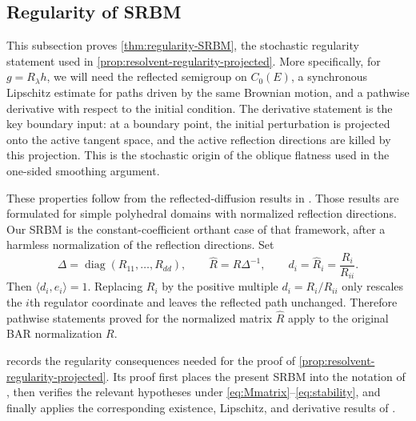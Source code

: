 \documentclass[aihp]{imsart}
\numberwithin{equation}{section}
\theoremstyle{plain}
\theoremstyle{definition}
\newcommand{\diag}{\operatorname{diag}}
\newcommand{\1}{\mathbf 1}
\begin{document}
\subsection{Regularity of SRBM}\label{sec:regularity-SRBM}

This subsection proves \cref{thm:regularity-SRBM}, the stochastic regularity
statement used in \cref{prop:resolvent-regularity-projected}.  More specifically, for
$g=R_\lambda h$, we will need the reflected semigroup on $C_0(E)$, a
synchronous Lipschitz estimate for paths driven by the same Brownian motion, and
a pathwise derivative with respect to the initial condition.  The derivative
statement is the key boundary input: at a boundary point, the initial
perturbation is projected onto the active tangent space, and the active
reflection directions are killed by this projection.  This is the stochastic
origin of the oblique flatness used in the one-sided smoothing argument.

These properties follow from the reflected-diffusion results in
\cite{LipshutzRamanan2019,LipshutzRamanan2021}.  Those results are formulated for
simple polyhedral domains with normalized reflection directions.  Our SRBM is
the constant-coefficient orthant case of that framework, after a harmless
normalization of the reflection directions.  Set
\[
        \Delta=\diag(R_{11},\ldots,R_{dd}),\qquad
        \widehat R=R\Delta^{-1},\qquad
        d_i=\widehat R_i=\frac{R_i}{R_{ii}} .
\]
Then $\langle d_i,e_i\rangle=1$.  Replacing $R_i$ by the positive multiple
$d_i=R_i/R_{ii}$ only rescales the $i$th regulator coordinate and leaves the
reflected path unchanged.  Therefore pathwise statements proved for the
normalized matrix $\widehat R$ apply to the original BAR normalization $R$.

 records the regularity consequences needed for the
proof of \cref{prop:resolvent-regularity-projected}.  Its proof first places the
present SRBM into the notation of \cite{LipshutzRamanan2019,LipshutzRamanan2021},
then verifies the relevant hypotheses under
\eqref{eq:Mmatrix}--\eqref{eq:stability}, and finally applies the corresponding
existence, Lipschitz, and derivative results of \cite{LipshutzRamanan2019,LipshutzRamanan2021}.
\end{document}
